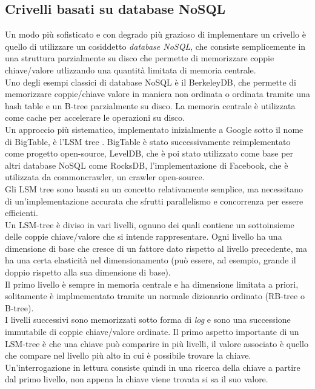\subsection{Crivelli basati su database NoSQL}
Un modo più sofisticato e con degrado più grazioso di implementare un crivello è quello di utilizzare un cosiddetto \textit{database NoSQL}, che consiste semplicemente in una struttura parzialmente su disco che permette di memorizzare coppie chiave/valore utlizzando una quantità limitata di memoria centrale.\\
Uno degli esempi classici di database NoSQL è il BerkeleyDB, che permette di memorizzare coppie/chiave valore in maniera non ordinata o ordinata tramite una hash table e un B-tree parzialmente su disco. La memoria centrale è utilizzata come cache per accelerare le operazioni su disco.\\
Un approccio più sistematico, implementato inizialmente a Google sotto il nome di BigTable, è l'LSM tree \cite{bigTable}.
BigTable è stato successivamente reimplementato come progetto open-source, LevelDB, che è poi stato utilizzato come base per altri database NoSQL come RocksDB, l'implementazione di Facebook, che è utilizzata da commoncrawler, un crawler open-source.\\
Gli LSM tree sono basati su un concetto relativamente semplice, ma necessitano di un'implementazione accurata che sfrutti parallelismo e concorrenza per essere efficienti.\\
Un LSM-tree è diviso in vari livelli, ognuno dei quali contiene un sottoinsieme delle coppie chiave/valore che si intende rappresentare. Ogni livello ha una dimensione di base che cresce di un fattore dato rispetto al livello precedente, ma ha una certa elasticità nel dimensionamento (può essere, ad esempio, grande il doppio rispetto alla sua dimensione di base).\\
Il primo livello è sempre in memoria centrale e ha dimensione limitata a priori, solitamente è implmementato tramite un normale dizionario ordinato (RB-tree o B-tree).\\
I livelli successivi sono memorizzati sotto forma di \textit{log} e sono una successione immutabile di coppie chiave/valore ordinate.
Il primo aspetto importante di un LSM-tree è che una chiave può comparire in più livelli, il valore associato è quello che compare nel livello più alto in cui è possibile trovare la chiave. Un'interrogazione in lettura consiste quindi in una ricerca della chiave a partire dal primo livello, non appena la chiave viene trovata si sa il suo valore.\\
